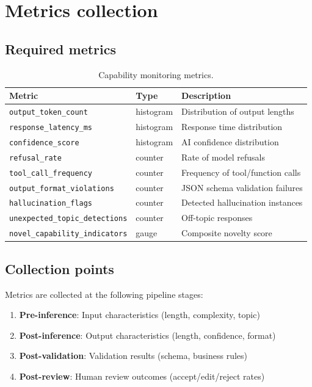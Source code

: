 \section{Metrics collection}

\subsection{Required metrics}

\begin{table}[htbp]
\centering
\caption{Capability monitoring metrics.}
\label{tab:monitor-metrics}
\footnotesize
\begin{tabularx}{\linewidth}{@{}l l X@{}}
\toprule
\textbf{Metric} & \textbf{Type} & \textbf{Description} \\ \midrule
\texttt{output\_token\_count} & histogram & Distribution of output lengths \\
\texttt{response\_latency\_ms} & histogram & Response time distribution \\
\texttt{confidence\_score} & histogram & AI confidence distribution \\
\texttt{refusal\_rate} & counter & Rate of model refusals \\
\texttt{tool\_call\_frequency} & counter & Frequency of tool/function calls \\
\texttt{output\_format\_violations} & counter & JSON schema validation failures \\
\texttt{hallucination\_flags} & counter & Detected hallucination instances \\
\texttt{unexpected\_topic\_detections} & counter & Off-topic responses \\
\texttt{novel\_capability\_indicators} & gauge & Composite novelty score \\
\bottomrule
\end{tabularx}
\end{table}

\subsection{Collection points}

Metrics are collected at the following pipeline stages:

\begin{enumerate}
  \item \textbf{Pre-inference}: Input characteristics (length, complexity, topic)
  \item \textbf{Post-inference}: Output characteristics (length, confidence, format)
  \item \textbf{Post-validation}: Validation results (schema, business rules)
  \item \textbf{Post-review}: Human review outcomes (accept/edit/reject rates)
\end{enumerate}

